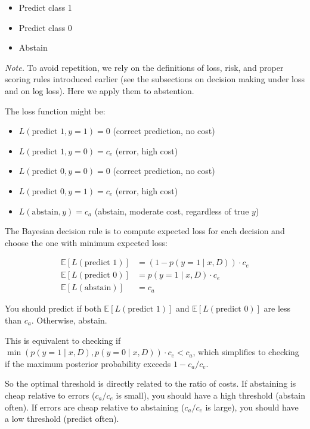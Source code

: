 \begin{itemize}
\item Predict class 1
\item Predict class 0
\item Abstain
\end{itemize}

\noindent\emph{Note.} To avoid repetition, we rely on the definitions of loss, risk, and proper scoring rules introduced earlier (see the subsections on decision making under loss and on log loss). Here we apply them to abstention.

The loss function might be:

\begin{itemize}
\item $L(\text{predict 1}, y=1) = 0$ (correct prediction, no cost)
\item $L(\text{predict 1}, y=0) = c_e$ (error, high cost)
\item $L(\text{predict 0}, y=0) = 0$ (correct prediction, no cost)
\item $L(\text{predict 0}, y=1) = c_e$ (error, high cost)
\item $L(\text{abstain}, y) = c_a$ (abstain, moderate cost, regardless of true $y$)
\end{itemize}

The Bayesian decision rule is to compute expected loss for each decision and choose the one with minimum expected loss:

\begin{align}
\mathbb{E}[L(\text{predict 1})] &= (1 - p(y=1 \mid x, D)) \cdot c_e \\
\mathbb{E}[L(\text{predict 0})] &= p(y=1 \mid x, D) \cdot c_e \\
\mathbb{E}[L(\text{abstain})] &= c_a
\end{align}

You should predict if both $\mathbb{E}[L(\text{predict 1})]$ and $\mathbb{E}[L(\text{predict 0})]$ are less than $c_a$. Otherwise, abstain.

This is equivalent to checking if $\min(p(y=1 \mid x, D), p(y=0 \mid x, D)) \cdot c_e < c_a$, which simplifies to checking if the maximum posterior probability exceeds $1 - c_a / c_e$.

So the optimal threshold is directly related to the ratio of costs. If abstaining is cheap relative to errors ($c_a / c_e$ is small), you should have a high threshold (abstain often). If errors are cheap relative to abstaining ($c_a / c_e$ is large), you should have a low threshold (predict often).

